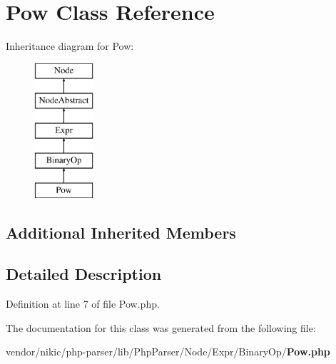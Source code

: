 \section{Pow Class Reference}
\label{class_php_parser_1_1_node_1_1_expr_1_1_binary_op_1_1_pow}
Inheritance diagram for Pow\+:\begin{figure}[H]
\begin{center}
\leavevmode
\includegraphics[height=5.000000cm]{class_php_parser_1_1_node_1_1_expr_1_1_binary_op_1_1_pow}
\end{center}
\end{figure}
\subsection*{Additional Inherited Members}


\subsection{Detailed Description}


Definition at line 7 of file Pow.\+php.



The documentation for this class was generated from the following file\+:\begin{DoxyCompactItemize}
\item 
vendor/nikic/php-\/parser/lib/\+Php\+Parser/\+Node/\+Expr/\+Binary\+Op/{\bf Pow.\+php}\end{DoxyCompactItemize}
